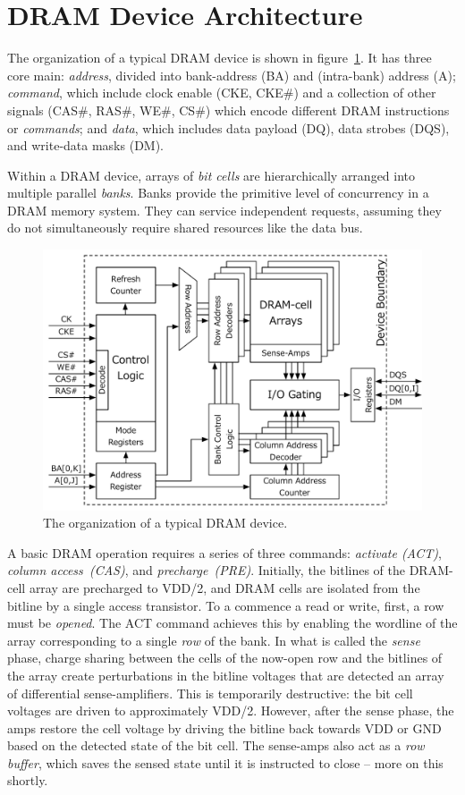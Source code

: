 \section{DRAM Device Architecture}\label{sec:dram-arch}

The organization of a typical DRAM device is shown in
figure~\ref{fig:dram-device}. It has three core main:
\emph{address}, divided into bank-address (BA) and (intra-bank) address (A);
\emph{command}, which include clock enable (CKE, CKE\#) and a collection of other
signals (CAS\#, RAS\#, WE\#, CS\#) which encode different DRAM instructions or
\emph{commands}; and \emph{data}, which includes data payload (DQ), data
strobes (DQS), and write-data masks (DM).

Within a DRAM device, arrays of \emph{bit cells} are hierarchically arranged into multiple parallel
\emph{banks}.  Banks provide the primitive level of concurrency in a DRAM
memory system. They can service independent requests, assuming they do not
simultaneously require shared resources like the data bus.

\begin{figure}
	\centering
	\includegraphics[width=16cm]{figures/dram-device.pdf}
    \caption{The organization of a typical DRAM device.}
	\label{fig:dram-device}
\end{figure}

A basic DRAM operation requires a series of three commands: \emph{activate
(ACT)}, \emph{column access~(CAS)}, and \emph{precharge~(PRE)}. Initially, the
bitlines of the DRAM-cell array are precharged to VDD/2, and DRAM cells are
isolated from the bitline by a single access transistor. To a commence a read or write, first, a row must be
\emph{opened}. The ACT command achieves this by enabling the wordline of the
array corresponding to a single \emph{row} of the bank. In what is called the \emph{sense}
phase, charge sharing between the cells of the now-open row and the bitlines of
the array create perturbations in the bitline voltages that are detected an
array of differential sense-amplifiers. This is temporarily destructive: the
bit cell voltages are driven to approximately VDD/2. However, after the
sense phase, the amps restore the cell voltage by driving the bitline back
towards VDD or GND based on the detected state of the bit cell. The sense-amps
also act as a \emph{row buffer}, which saves the sensed state until it is
instructed to close -- more on this shortly.

